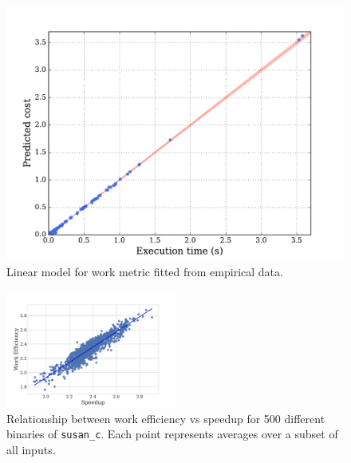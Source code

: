     \begin{figure}[t]
        \centering
        \includegraphics[width=0.6\linewidth]{figs/cost-model.pdf}
        \caption{
            Linear model for work metric fitted from empirical data.
        }
        \label{fig:cost-model}
    \end{figure}

    \begin{figure}[t]
        \centering
        \includegraphics[width=0.5\textwidth]{figs/motivation-work-efficiency.pdf}
        \caption{Relationship between work efficiency vs speedup for 500 different binaries of \texttt{susan\_c}.
                Each point represents averages over a subset of all inputs.}
        \label{fig:motivation-work-efficiency}
    \end{figure}

